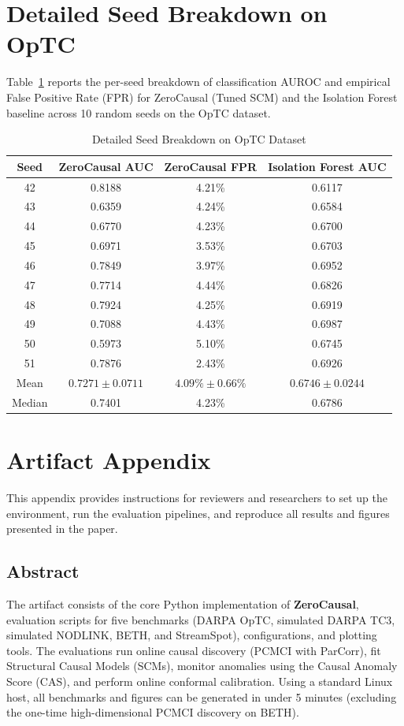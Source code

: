 \appendices
\section{Detailed Seed Breakdown on OpTC}
Table~\ref{tab:seed_breakdown} reports the per-seed breakdown of classification AUROC and empirical False Positive Rate (FPR) for ZeroCausal (Tuned SCM) and the Isolation Forest baseline across 10 random seeds on the OpTC dataset.

\begin{table}[htbp]
\centering
\caption{Detailed Seed Breakdown on OpTC Dataset}
\begin{tabular}{cccc}
\toprule
Seed & ZeroCausal AUC & ZeroCausal FPR & Isolation Forest AUC \\
\midrule
42 & 0.8188 & 4.21\% & 0.6117 \\
43 & 0.6359 & 4.24\% & 0.6584 \\
44 & 0.6770 & 4.23\% & 0.6700 \\
45 & 0.6971 & 3.53\% & 0.6703 \\
46 & 0.7849 & 3.97\% & 0.6952 \\
47 & 0.7714 & 4.44\% & 0.6826 \\
48 & 0.7924 & 4.25\% & 0.6919 \\
49 & 0.7088 & 4.43\% & 0.6987 \\
50 & 0.5973 & 5.10\% & 0.6745 \\
51 & 0.7876 & 2.43\% & 0.6926 \\
\midrule
Mean & $0.7271 \pm 0.0711$ & $4.09\% \pm 0.66\%$ & $0.6746 \pm 0.0244$ \\
Median & 0.7401 & 4.23\% & 0.6786 \\
\bottomrule
\end{tabular}
\label{tab:seed_breakdown}
\end{table}

\section{Artifact Appendix}

This appendix provides instructions for reviewers and researchers to set up the environment, run the evaluation pipelines, and reproduce all results and figures presented in the paper.

\subsection{Abstract}
The artifact consists of the core Python implementation of \textbf{ZeroCausal}, evaluation scripts for five benchmarks (DARPA OpTC, simulated DARPA TC3, simulated NODLINK, BETH, and StreamSpot), configurations, and plotting tools. The evaluations run online causal discovery (PCMCI with ParCorr), fit Structural Causal Models (SCMs), monitor anomalies using the Causal Anomaly Score (CAS), and perform online conformal calibration. Using a standard Linux host, all benchmarks and figures can be generated in under 5 minutes (excluding the one-time high-dimensional PCMCI discovery on BETH).

